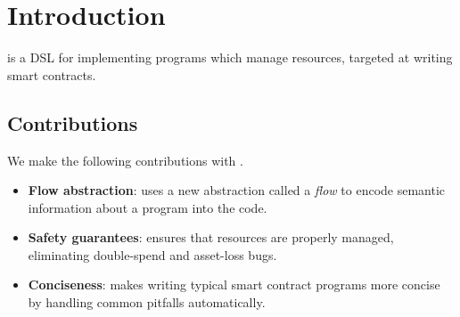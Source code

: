 \documentclass[sigconf]{acmart}
\begin{document}

\maketitle

\section{Introduction}

\langName is a DSL for implementing programs which manage resources, targeted at writing smart contracts.

\subsection{Contributions}

We make the following contributions with \langName.
\begin{itemize}
    \item \textbf{Flow abstraction}: \langName uses a new abstraction called a \emph{flow} to encode semantic information about a program into the code.

    \item \textbf{Safety guarantees}: \langName ensures that resources are properly managed, eliminating double-spend and asset-loss bugs.

    \item \textbf{Conciseness}: \langName makes writing typical smart contract programs more concise by handling common pitfalls automatically.


\end{itemize}
\end{document}
